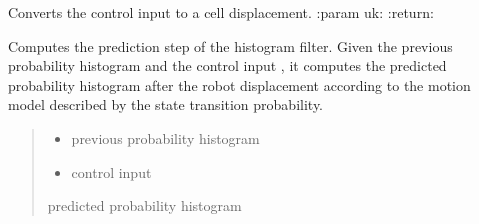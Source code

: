 \documentclass[letterpaper,10pt,english]{sphinxmanual}
\begin{document}
\begin{fulllineitems}

\begin{fulllineitems}
\label{\detokenize{HF:HF.HF.uk2cell}}
\pysigstartsignatures
{}
\pysigstopsignatures
\sphinxAtStartPar
Converts the control input  to a cell displacement.
:param uk:
:return:

\end{fulllineitems}


\begin{fulllineitems}
\label{\detokenize{HF:HF.HF.Prediction}}
\pysigstartsignatures
{}
\pysigstopsignatures
\sphinxAtStartPar
Computes the prediction step of the histogram filter. Given the previous probability histogram  and the
control input , it computes the predicted probability histogram  after the robot displacement 
according to the motion model described by the state transition probability.
\begin{quote}\begin{description}
\begin{itemize}
\item {} 
\sphinxAtStartPar
{} \textendash{} previous probability histogram

\item {} 
\sphinxAtStartPar
{} \textendash{} control input

\end{itemize}

\sphinxAtStartPar
{} predicted probability histogram

\end{description}\end{quote}

\end{fulllineitems}



\end{fulllineitems}
\end{document}
